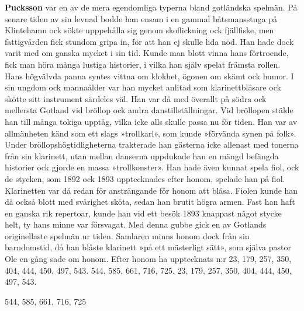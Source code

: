 \textbf{Pucksson} var en av de mera egendomliga typerna bland gotländska spelmän.
På senare tiden av sin levnad bodde han ensam i en gammal båtsmansstuga på Klintehamn ock sökte upppehålla sig genom skoflickning ock fjällfiske, men fattigvården fick stundom gripa in, för att han ej skulle lida nöd. Han hade dock varit med om ganska mycket i sin tid. Kunde man blott vinna hans förtroende, fick man höra många lustiga historier, i vilka han själv spelat främsta rollen. Hans högvälvda panna syntes vittna om klokhet, ögonen om skämt ock humor. I sin ungdom ock mannaålder var han mycket anlitad som klarinettblåsare ock skötte sitt instrument särdeles väl. Han var då med överallt på södra ock mellersta Gotland vid bröllop ock andra danstillställningar. Vid bröllopen stälde han till många tokiga upptåg, vilka icke alls skulle passa nu för tiden. Han var av allmänheten känd som ett slags »trollkarl», som kunde »förvända synen på folk». Under bröllopshögtidligheterna trakterade han gästerna icke allenast med tonerna från sin klarinett, utan mellan danserna uppdukade han en mängd befängda historier ock gjorde en massa »trollkonster». Han hade även kunnat spela fiol, ock de stycken, som 1892 ock 1893 upptecknades efter honom, spelade han på fiol. Klarinetten var då redan för ansträngande för honom att blåsa. Fiolen kunde han då också blott med svårighet sköta, sedan han brutit högra armen. Fast han haft en ganska rik repertoar, kunde han vid ett besök 1893 knappast något stycke helt, ty hans minne var försvagat. Med denna gubbe
gick en av Gotlands originellaste spelmän ur tiden. Samlaren minns honom dock från sin barndomstid, då han blåste klarinett »på ett mästerligt sätt», som själva pastor Ole en gång sade om honom. Efter honom ha upptecknats n:r 23, 179, 257, 350, 404, 444, 450, 497, 543. 544, 585, 661, 716, 725. 23, 179, 257, 350, 404, 444, 450, 497, 543. 

544, 585, 661, 716, 725 
